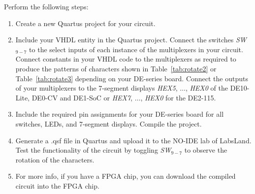 \documentclass[epsfig,10pt,fullpage]{article}
\newcommand{\CommonDocsPath}{../../../common/docs}
\begin{document}
Perform the following steps:
\begin{enumerate}
\item Create a new Quartus  project for your circuit.
\item Include your VHDL entity in the Quartus  project. Connect the switches 
{\it SW}$_{9-7}$ to the select inputs of each instance of the 
multiplexers in your circuit. Connect constants in your VHDL code to the multiplexers 
as required to produce the patterns of characters shown in Table~\ref{tab:rotate2} or 
Table~\ref{tab:rotate3} depending on your DE-series board.
Connect the outputs of your multiplexers to the 7-segment displays {\it HEX5}, $\ldots$, 
{\it HEX0} of the DE10-Lite, DE0-CV and DE1-SoC or {\it HEX7}, $\ldots$, 
{\it HEX0} for the DE2-115.
\item Include the required pin assignments for your DE-series board for all switches, LEDs, 
and 7-segment displays. Compile the project.
\item Generate a .qsf file in Quartus and upload it to the NO-IDE lab of LabsLand. Test the functionality of the 
circuit by toggling {\it SW}$_{9-7}$ to observe the rotation of the characters.
\item For more info, if you have a FPGA chip, you can download the compiled circuit into the FPGA chip.
\end{enumerate}



\end{document}
